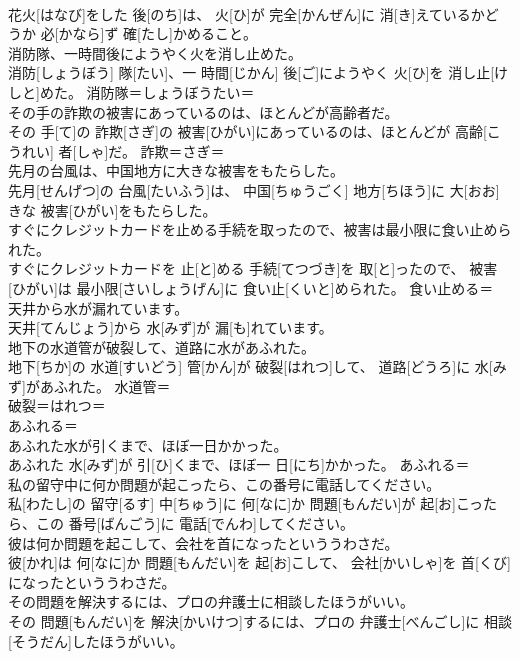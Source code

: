 \documentclass[8pt]{extreport}
\begin{document}
\begin{CJK}{UTF8}{min}
\\	花火[はなび]をした 後[のち]は、 火[ひ]が 完全[かんぜん]に 消[き]えているかどうか 必[かなら]ず 確[たし]かめること。	
\\	消防隊、一時間後にようやく火を消し止めた。	
\\	消防[しょうぼう] 隊[たい]、一 時間[じかん] 後[ご]にようやく 火[ひ]を 消し止[けしと]めた。	消防隊＝しょうぼうたい＝ 
\\	その手の詐欺の被害にあっているのは、ほとんどが高齢者だ。	
\\	その 手[て]の 詐欺[さぎ]の 被害[ひがい]にあっているのは、ほとんどが 高齢[こうれい] 者[しゃ]だ。	詐欺＝さぎ＝ 
\\	先月の台風は、中国地方に大きな被害をもたらした。	
\\	先月[せんげつ]の 台風[たいふう]は、 中国[ちゅうごく] 地方[ちほう]に 大[おお]きな 被害[ひがい]をもたらした。	
\\	すぐにクレジットカードを止める手続を取ったので、被害は最小限に食い止められた。	
\\	すぐにクレジットカードを 止[と]める 手続[てつづき]を 取[と]ったので、 被害[ひがい]は 最小限[さいしょうげん]に 食い止[くいと]められた。	食い止める＝ 
\\	天井から水が漏れています。	
\\	天井[てんじょう]から 水[みず]が 漏[も]れています。	
\\	地下の水道管が破裂して、道路に水があふれた。	
\\	地下[ちか]の 水道[すいどう] 管[かん]が 破裂[はれつ]して、 道路[どうろ]に 水[みず]があふれた。	水道管＝ 
\\	破裂＝はれつ＝ 
\\	あふれる＝ 
\\	あふれた水が引くまで、ほぼ一日かかった。	
\\	あふれた 水[みず]が 引[ひ]くまで、ほぼ一 日[にち]かかった。	あふれる＝ 
\\	私の留守中に何か問題が起こったら、この番号に電話してください。	
\\	私[わたし]の 留守[るす] 中[ちゅう]に 何[なに]か 問題[もんだい]が 起[お]こったら、この 番号[ばんごう]に 電話[でんわ]してください。	
\\	彼は何か問題を起こして、会社を首になったといううわさだ。	
\\	彼[かれ]は 何[なに]か 問題[もんだい]を 起[お]こして、 会社[かいしゃ]を 首[くび]になったといううわさだ。	
\\	その問題を解決するには、プロの弁護士に相談したほうがいい。	
\\	その 問題[もんだい]を 解決[かいけつ]するには、プロの 弁護士[べんごし]に 相談[そうだん]したほうがいい。	

\end{CJK}
\end{document}
